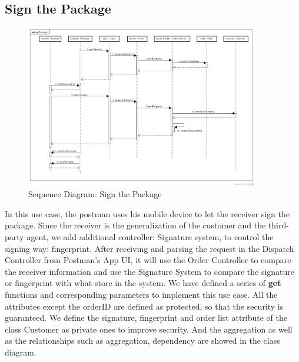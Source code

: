 \documentclass[12pt]{scrreprt}
\begin{document}
\subsection{Sign the Package}
\begin{figure}[htbp]
	\centering\includegraphics[width=4in]{DocumentRes/34SequenceDiagram_signPackage.png}
	\caption{Sequence Diagram: Sign the Package}
\end{figure}
In this use case, the postman uses his mobile device to let the receiver sign the package. Since the receiver is the generalization of the customer and the third-party agent, we add additional controller: Signature system, to control the signing way: fingerprint. After receiving and parsing the request in the Dispatch Controller from Postman's App UI, it will use the Order Controller to compare the receiver information and use the Signature System to compare the signature or fingerprint with what store in the system. We have defined a series of \textbf{get} functions and corresponding parameters to implement this use case. All the attributes except the orderID are defined as protected, so that the security is guaranteed. We define the signature, fingerprint and order list attribute of the class Customer as private ones to improve security. And the aggregation as well as the relationships such as aggregation, dependency are showed in the class diagram.\\
\end{document}
